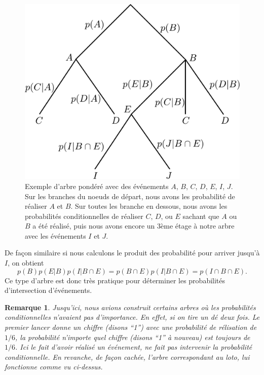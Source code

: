 \documentclass[a4paper,12pt]{book}
\newtheorem*{remarque}{Remarque}
\begin{document}
\begin{figure}[htp]
\begin{center}
\includegraphics[height=4.8truecm]{figs/arbre_pondere_2.pdf}
\end{center}
\caption{Exemple d'arbre pondéré avec des événements $A$, $B$, $C$, $D$, $E$, $I$, $J$. Sur les branches du noeuds de départ, nous avons les probabilité de réaliser $A$ et $B$.
Sur toutes les branche en dessous, nous avons les probabilités conditionnelles de réaliser $C$, $D$, ou $E$ sachant que $A$ ou $B$ a été réalisé, 
puis nous avons encore un 3ème étage à notre arbre avec les événements $I$ et $J$.}\label{fig_arbre_pondere_2}
\end{figure}
De façon similaire si nous calculons le produit des probabilité pour arriver jusqu'à $I$, on obtient
\begin{equation}
 p(B)p(E|B)p(I|B\cap E)=p(B\cap E)p(I|B\cap E)=p(I\cap B\cap E).
\end{equation}
Ce type d'arbre est donc très pratique pour déterminer les probabilités d'intersection d'événements.

\begin{remarque}
Jusqu'ici, nous avions construit certains arbres où les probabilités conditionnelles n'avaient pas d'importance. En effet, si on tire un dé
deux fois.  Le premier lancer donne un chiffre (disons ``1'') avec une probabilité de rélisation de $1/6$, 
la probabilité n'importe quel chiffre (disons ``1'' à nouveau) est toujours de $1/6$. Ici le fait d'avoir réalisé un événement,
ne fait pas intervenir la probabilité conditionnelle. En revanche, de façon cachée, l'arbre correspondant au loto, lui fonctionne comme vu ci-dessus.
\end{remarque}
\end{document}
